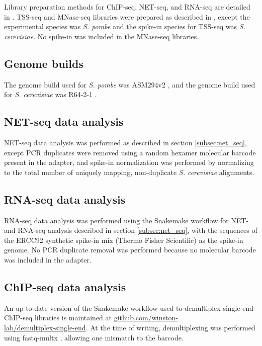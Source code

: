 Library preparation methods for ChIP-seq, NET-seq, and RNA-seq are detailed in \citet{shetty2017}.
TSS-seq and MNase-seq libraries were prepared as described in \citet{doris2018}, except the experimental species was \textit{S. pombe} and the spike-in species for TSS-seq was \textit{S. cerevisiae}.
No spike-in was included in the MNase-seq libraries.

\subsection{Genome builds}

The genome build used for \textit{S. pombe} was ASM294v2 \citep{wood2002}, and the genome build used for \textit{S. cerevisiae} was R64-2-1 \citep{engel2014}.

\subsection{NET-seq data analysis}

NET-seq data analysis was performed as described in section \ref{subsec:net_seq}, except PCR duplicates were removed using a random hexamer molecular barcode present in the adapter, and spike-in normalization was performed by normalizing to the total number of uniquely mapping, non-duplicate \textit{S. cerevisiae} alignments.

\subsection{RNA-seq data analysis}

RNA-seq data analysis was performed using the Snakemake workflow for NET- and RNA-seq analysis described in section \ref{subsec:net_seq}, with the sequences of the ERCC92 synthetic spike-in mix (Thermo Fisher Scientific) as the spike-in genome.
No PCR duplicate removal was performed because no molecular barcode was included in the adapter.

\subsection{ChIP-seq data analysis}

An up-to-date version of the Snakemake \citep{koster2012} workflow used to demultiplex single-end ChIP-seq libraries is maintained at \href{https://github.com/winston-lab/demultiplex-single-end}{github.com/winston-\\lab/demultiplex-single-end}.
At the time of writing, demultiplexing was performed using fastq-multx \citep{aronesty2013}, allowing one mismatch to the barcode.


